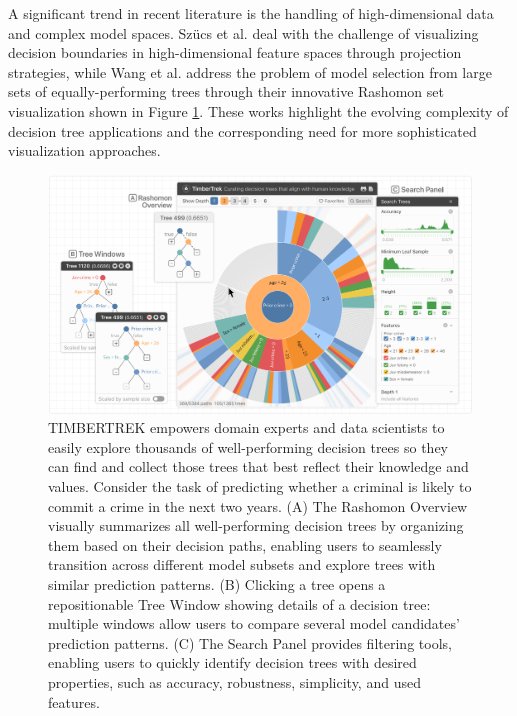 A significant trend in recent literature is the handling of high-dimensional data and complex model spaces. Szücs et al. \cite{szucs2018decision} deal with the challenge of visualizing decision boundaries in high-dimensional feature spaces through projection strategies, while Wang et al. \cite{wang2022timbertrek} address the problem of model selection from large sets of equally-performing trees through their innovative Rashomon set visualization shown in Figure \ref{fig:timbertrek_system}. These works highlight the evolving complexity of decision tree applications and the corresponding need for more sophisticated visualization approaches.

\begin{figure}[ht!]
    \centering
    \includegraphics[width=0.95\linewidth]{images/TIMBERTREK .png}
    \caption{TIMBERTREK empowers domain experts and data scientists to easily explore thousands of well-performing decision trees so
they can find and collect those trees that best reflect their knowledge and values. Consider the task of predicting whether a criminal
is likely to commit a crime in the next two years. (A) The Rashomon Overview visually summarizes all well-performing decision trees
by organizing them based on their decision paths, enabling users to seamlessly transition across different model subsets and explore
trees with similar prediction patterns. (B) Clicking a tree opens a repositionable Tree Window showing details of a decision tree:
multiple windows allow users to compare several model candidates’ prediction patterns. (C) The Search Panel provides filtering tools,
enabling users to quickly identify decision trees with desired properties, such as accuracy, robustness, simplicity, and used features.}
    \label{fig:timbertrek_system}
\end{figure}

